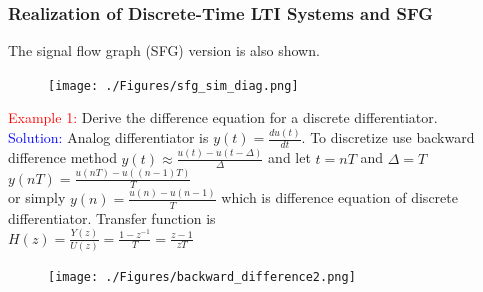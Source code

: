 \documentclass[mathserif, 10pt]{beamer} %
\begin{document}
\frame
{

\normalsize

\frametitle{Realization of Discrete-Time LTI Systems and SFG}
\vspace{-.1in}
The signal flow graph (SFG) version is also shown.

\begin{figure}[h!]
\texttt{[image: ./Figures/sfg\_sim\_diag.png]}
\end{figure}

\textcolor{red}{Example 1:} Derive the difference equation for a discrete differentiator. \\

\textcolor{blue}{Solution:}  Analog differentiator is $y(t) = \frac{du(t)}{dt}$. To discretize use backward difference method
$y(t) \approx \frac{u(t)-u(t-\Delta)}{\Delta}$ and let $t=nT$ and $\Delta=T$  \\

$y(nT) = \frac{u(nT)-u((n-1)T)}{T}$\\
or simply $y(n) = \frac{u(n)-u(n-1)}{T}$ which is difference equation of discrete differentiator. Transfer function is \\
\vspace{.1in}
$H(z)=\frac{Y(z)}{U(z)} = \frac{1-z^{-1}}{T} = \frac{z-1}{zT}$
\vspace{-.43in}
\begin{figure}[h!]
\hspace{2in}
\texttt{[image: ./Figures/backward\_difference2.png]}
\end{figure}

}
\frame
\end{document}
